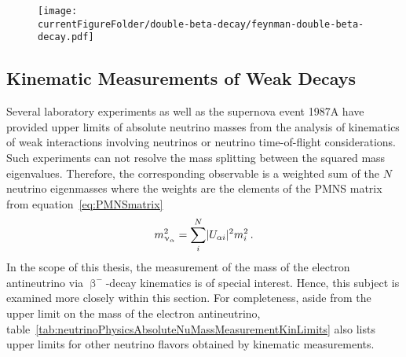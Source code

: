 \begin{figure}[t]
	\centering
	\texttt{[image: \\currentFigureFolder/double-beta-decay/feynman-double-beta-decay.pdf]}
	\label{fig:neutrinoPhysicsAbsoluteNuMassMeasurementDoubleBeta}
\end{figure}

\subsection{Kinematic Measurements of Weak Decays}
\label{sec:neutrinoPhysicsAbsoluteNuMassMeasurementKinematics}
Several laboratory experiments as well as the
supernova event 1987A have provided upper limits of absolute neutrino masses from the analysis of kinematics of weak interactions involving neutrinos or neutrino time-of-flight considerations. Such experiments can not resolve the mass splitting between the squared mass eigenvalues. Therefore, the corresponding observable is a weighted sum of the $N$ neutrino eigenmasses where the weights are the elements of the PMNS matrix from equation~\eqref{eq:PMNSmatrix}~\cite{Otten:2008zz}
\begin{equation}
\label{eq:nuMassSquared}
    m^2_{\upnu_{\alpha}} = \sum_{i}^{N}\lvert U_{\alpha i}\rvert^2 m_i^2 \text{\,.}
\end{equation}
In the scope of this thesis, the measurement of the mass of the electron antineutrino via $\upbeta^-$-decay kinematics is of special interest. Hence, this subject is examined more closely within this section. For completeness, aside from the upper limit on the mass of the electron antineutrino, table~\ref{tab:neutrinoPhysicsAbsoluteNuMassMeasurementKinLimits} also lists upper limits for other neutrino flavors obtained by kinematic measurements.
